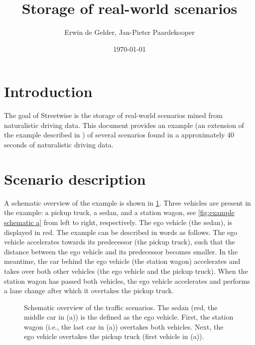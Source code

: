 \documentclass[10pt,final,a4paper,oneside,onecolumn]{article}
\def\reptitle{Storage of real-world scenarios}
\def\repauthor{Erwin de Gelder, Jan-Pieter Paardekooper}
\newlength\figurewidth
\newlength\figureheight
\theoremstyle{plain}\newtheorem{definition}{Definition}[section]    %
\theoremstyle{definition}\newtheorem{example}{Example}[section]     %
\theoremstyle{remark}\newtheorem{remarkenv}{Remark}[section]        %
\begin{document}

\title{\textbf{\reptitle}}
\author{\repauthor}
\date{\today}
\maketitle

\tableofcontents

\newpage

\section{Introduction}
\label{sec:introduction}

The goal of Streetwise is the storage of real-world scenarios mined from naturalistic driving data. This document provides an example (an extension of the example described in \cite{degelder2018ontology}) of several scenarios found in a approximately 40 seconds of naturalistic driving data.


\section{Scenario description}

A schematic overview of the example is shown in \cref{fig:example schematic}. Three vehicles are present in the example: a pickup truck, a sedan, and a station wagon, see \cref{fig:example schematic a} from left to right, respectively. The ego vehicle (the sedan), is displayed in red. The example can be described in words as follows. The ego vehicle accelerates towards its predecessor (the pickup truck), such that the distance between the ego vehicle and its predecessor becomes smaller. In the meantime, the car behind the ego vehicle (the station wagon) accelerates and takes over both other vehicles (the ego vehicle and the pickup truck). When the station wagon has passed both vehicles, the ego vehicle accelerates and performs a lane change after which it overtakes the pickup truck.

\setlength\figureheight{106pt}
\setlength\figurewidth{260pt}
\begin{figure}[b]
	\begin{minipage}[b]{\linewidth}
		\centering
		\label{fig:example schematic a}
	\end{minipage}
	\setlength\figureheight{100pt}
	\begin{minipage}[b]{\linewidth}
		\centering
		\label{fig:example schematic b}
	\end{minipage}
	\caption{Schematic overview of the traffic scenarios. The sedan (red, the middle car in (a)) is the defined as the ego vehicle. First, the station wagon (i.e., the last car in (a)) overtakes both vehicles. Next, the ego vehicle overtakes the pickup truck (first vehicle in (a)).}
	\label{fig:example schematic}
\end{figure}
\end{document}
